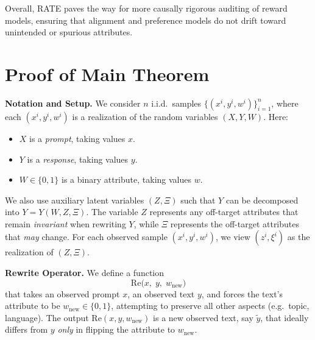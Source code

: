 \documentclass{article}
\theoremstyle{definition}
\begin{document}
Overall, RATE paves the way for more causally rigorous auditing of reward models, ensuring that alignment and preference models do not drift toward unintended or spurious attributes.

\newpage
\appendix
\section{Proof of Main Theorem}
\label{sec:proofs}
    \noindent
    \textbf{Notation and Setup.}  
    We consider \(n\) i.i.d.\ samples \(\{(x^i, y^i, w^i)\}_{i=1}^n\), where each \((x^i, y^i, w^i)\) is a realization of the random variables \((X, Y, W)\). Here:
    \begin{itemize}
        \item \(X\) is a \emph{prompt}, taking values \(x\).
        \item \(Y\) is a \emph{response}, taking values \(y\).
        \item \(W \in \{0,1\}\) is a binary attribute, taking values \(w\). 
    \end{itemize}
    We also use auxiliary latent variables \((Z, \Xi)\) such that \(Y\) can be decomposed into \(Y = Y(W, Z, \Xi)\). The variable \(Z\) represents any off-target attributes that remain \emph{invariant} when rewriting \(Y\), while \(\Xi\) represents the off-target attributes that \emph{may} change. For each observed sample \((x^i, y^i, w^i)\), we view \((z^i, \xi^i)\) as the realization of \((Z, \Xi)\).
    
    \bigskip
    
    \noindent
    \textbf{Rewrite Operator.}
    We define a function
    \[
    \text{Re}\bigl(x,\;y,\;w_{\text{new}}\bigr)
    \]
    that takes an observed prompt \(x\), an observed text \(y\), and forces the text’s attribute to be \(w_{\text{new}}\in\{0,1\}\), attempting to preserve all other aspects (e.g.\ topic, language). The output \(\text{Re}(x,y,w_{\text{new}})\) is a new observed text, say \(\tilde{y}\), that ideally differs from \(y\) \emph{only} in flipping the attribute to \(w_{\text{new}}\).
    
    \bigskip
    
\end{document}
